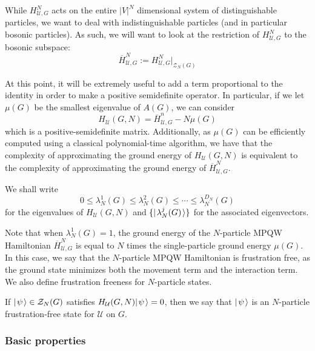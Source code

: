 \documentclass[../thesis-main/thesis-main]{subfiles}
\begin{document}
While $H_{\mathcal{U},G}^N$ acts on the entire $|V|^N$ dimensional system of distinguishable particles, we want to deal with indistinguishable particles (and in particular bosonic particles).  As such, we will want to look at the restriction of $H_{\mathcal{U},G}^N$ to the bosonic subspace:
\begin{equation}
  \overline{H}_{\mathcal{U},G}^N := H_{\mathcal{U},G}^N \big|_{\mathcal{Z}_N(G)}
\end{equation}


At this point, it will be extremely useful to add a term proportional to the identity in order to make a positive semidefinite operator. In particular, if we let $\mu(G)$ be the smallest eigenvalue of $A(G)$, we can consider 
\begin{equation}
  H_{\mathcal{U}}(G,N) = \overline{H}_{\mathcal{U},G}^n - N \mu(G)
\end{equation}
which is a positive-semidefinite matrix.  Additionally, as $\mu(G)$ can be efficiently computed using a classical polynomial-time algorithm, we have that the complexity of approximating the ground energy of $H_{\mathcal{U}}(G,N)$ is equivalent to the complexity of approximating the ground energy of $\overline{H}_{\mathcal{U},G}^N$.  

We shall write
\begin{equation}
  0 \leq \lambda_N^1(G) \leq \lambda_N^2(G) \leq \cdots \leq \lambda_N^{D_N} (G)
\end{equation}
for the eigenvalues of $H_{\mathcal{U}}(G,N)$ and $\{|\mspace{2mu} \lambda_N^j(G) \mspace{2mu} \rangle\}$ for the associated eigenvectors.

Note that when $\lambda_N^1(G) = 1$, the ground energy of the $N$-particle MPQW Hamiltonian $\overline{H}_{\mathcal{U},G}^N$ is equal to $N$ times the single-particle ground energy $\mu(G)$.  In this case, we say that the $N$-particle MPQW Hamiltonian is frustration free, as the ground state minimizes both the movement term and the interaction term.  We also define frustration freeness for $N$-particle states.
\begin{definition}  
If $|\mspace{2mu} \psi \mspace{2mu} \rangle\in \mathcal{Z}_{N}(G)$ satisfies $H_{\mathcal{U}}(G,N) |\mspace{2mu} \psi \mspace{2mu} \rangle = 0$, then we say that $|\mspace{2mu} \psi \mspace{2mu} \rangle$ is an $N$-particle frustration-free state for $\mathcal{U}$ on $G$.
\end{definition}

\subsubsection{Basic properties}
\end{document}
